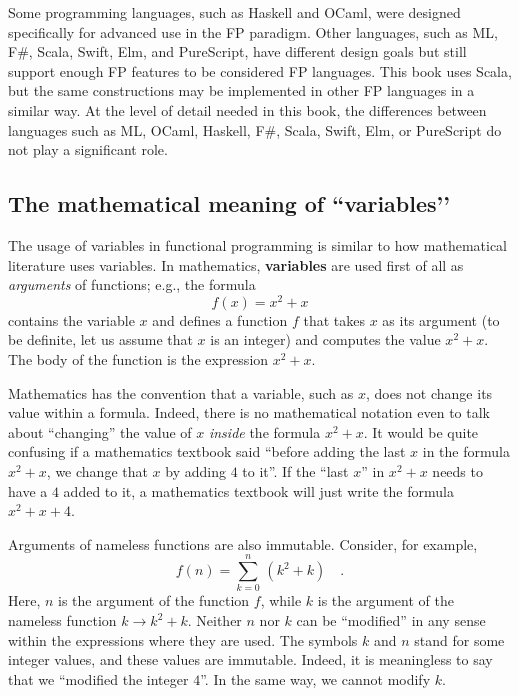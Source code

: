 Some programming languages, such as Haskell and OCaml, were designed
specifically for advanced use in the FP paradigm. Other languages,
such as ML, F\#, Scala, Swift, Elm, and PureScript, have different
design goals but still support enough FP features to be considered
FP languages. This book uses Scala, but the same constructions may
be implemented in other FP languages in a similar way. At the level
of detail needed in this book, the differences between languages such
as ML, OCaml, Haskell, F\#, Scala, Swift, Elm, or PureScript do not
play a significant role.

\subsection{The mathematical meaning of \textsf{``}variables\textsf{'}'}

The usage of variables in functional programming is similar to how
mathematical literature uses variables. In mathematics, \textbf{variables}
are used first of all as \emph{arguments} of functions; e.g., the
formula 
\[
f(x)=x^{2}+x
\]
contains the variable $x$ and defines a function $f$ that takes
$x$ as its argument (to be definite, let us assume that $x$ is an
integer) and computes the value $x^{2}+x$. The body of the function
is the expression $x^{2}+x$. 

Mathematics has the convention that a variable, such as $x$, does
not change its value within a formula. Indeed, there is no mathematical
notation even to talk about \textsf{``}changing\textsf{''} the value of $x$ \emph{inside}
the formula $x^{2}+x$. It would be quite confusing if a mathematics
textbook said \textsf{``}before adding the last $x$ in the formula $x^{2}+x$,
we change that $x$ by adding $4$ to it\textsf{''}. If the \textsf{``}last $x$\textsf{''}
in $x^{2}+x$ needs to have a $4$ added to it, a mathematics textbook
will just write the formula $x^{2}+x+4$.

Arguments of nameless functions are also immutable. Consider, for
example,
\[
f(n)=\sum_{k=0}^{n}\,(k^{2}+k)\quad.
\]
Here, $n$ is the argument of the function $f$, while $k$ is the
argument of the nameless function $k\rightarrow k^{2}+k$. Neither
$n$ nor $k$ can be \textsf{``}modified\textsf{''} in any sense within the expressions
where they are used. The symbols $k$ and $n$ stand for some integer
values, and these values are immutable. Indeed, it is meaningless
to say that we \textsf{``}modified the integer $4$\textsf{''}. In the same way, we
cannot modify $k$.

